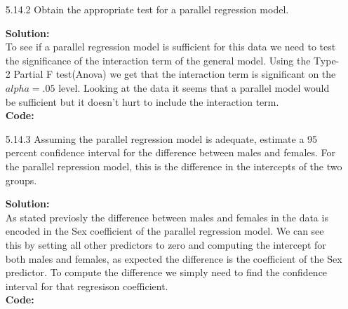 \documentclass[12pt]{article}
\makeatletter
\theoremstyle{homework}
\newenvironment{exercise}[1]
{\def\@currentlabel{#1}\exercisecore}
{\endexercisecore}
\newcommand{\localhead}[1]{\par\smallskip\noindent\textbf{#1}\nobreak\\}%
\newcommand\solution{\localhead{Solution:}}
\makeatother
\begin{document}
\begin{exercise}{1}
\begin{enumerate}
       \item[5.14.2] Obtain the appropriate test for a parallel regression model. \\
       \solution  To see if a parallel regression model is sufficient for this data we need to test the significance of the interaction term 
       of the general model. Using the Type-2 Partial F test(Anova) we get that the interaction term is significant on the $alpha = .05$ level.
       Looking at the data it seems that a parallel model would be sufficient but it doesn't hurt to include the interaction term. \\
       \textbf{Code:}
       \begin{center}
       
       \end{center}
       \newpage



       \item[5.14.3] Assuming the parallel regression model is adequate, estimate a 95 percent 
       confidence interval for the difference between males and females. For the parallel repression model, 
       this is the difference in the intercepts of the two groups.  \\
       \solution As stated previosly the difference between males and females in the data is encoded in the 
       Sex coefficient of the parallel regression model. We can see this by setting all other predictors to zero and computing the 
       intercept for both males and females, as expected the difference is the coefficient of the Sex predictor. To compute the difference we simply need to find the confidence 
       interval for that regresison coefficient. \\
       \textbf{Code:}
       \begin{center}
       
       \end{center}
  \end{enumerate} 
\end{exercise}
\newpage
\end{document}
